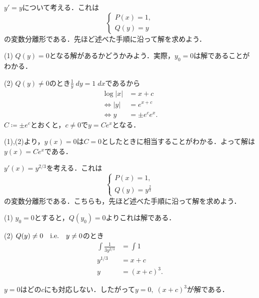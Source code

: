 \begin{example}
    $y'=y$について考える．これは
    \begin{equation}
        \begin{cases}
            P(x) = 1, \\
            Q(y) = y
        \end{cases}
    \end{equation}
    の変数分離形である．先ほど述べた手順に沿って解を求めよう．

    (1) $Q(y)=0$となる解があるかどうかみよう．実際，$y_0=0$は解であることがわかる．

    (2) $Q(y) \neq 0$のとき$\frac{1}{y} \; dy = 1 \; dx$であるから
    \begin{align*}
        \log |x| &= x+c \\
        \iff |y| &= e^{x+c} \\
        \iff y &= \pm e^c e^x.
    \end{align*}
    $C \coloneqq \pm e^c$とおくと，$c \neq 0$で$y=Ce^x$となる．

    (1),(2)より，$y(x)=0$は$C=0$としたときに相当することがわかる．よって解は$y(x)=Ce^x$である．
\end{example}

\begin{example}
    $y'(x)=y^{2/3}$を考える．これは
    \begin{equation}
        \begin{cases}
            P(x) = 1, \\
            Q(y) = y^{\frac{2}{3}}
        \end{cases}
    \end{equation}
    の変数分離形である．こちらも，先ほど述べた手順に沿って解を求めよう．

    (1) $y_0=0$とすると，$Q(y_0)=0$よりこれは解である．

    (2) $Q(y) \neq 0 \quad \text{i.e.} \quad y \neq 0$のとき
    \begin{align*}
        \int \frac{1}{3y^{2/3}} &= \int 1 \\
        y^{1/3} &= x+c \\
        y &= (x+c)^3.
    \end{align*}

    $y=0$はどの$c$にも対応しない．したがって$y=0, \; (x+c)^3$が解である．
\end{example}

